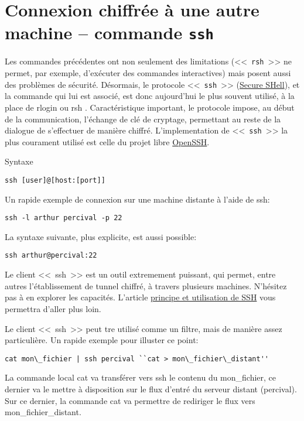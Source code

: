 \section{Connexion chiffr{\'e}e {\`a} une autre machine -- commande {\tt ssh}}
Les commandes pr{\'e}c{\'e}dentes ont non seulement des limitations (<<~{\tt rsh}~>> ne permet, par exemple, d'ex{\'e}cuter des commandes interactives) mais posent aussi des probl{\`e}mes de s{\'e}curit{\'e}. D{\'e}sormais, le protocole <<~\texttt{ssh}~>> (\href{http://fr.wikipedia.org/wiki/Secure_shell/}{Secure SHell}), et la commande qui lui est associ{\'e}, est donc aujourd'hui le plus souvent utilis{\'e}, {\`a} la place de rlogin ou rsh .
Caract{\'e}ristique important, le protocole impose, au d{\'e}but de la communication, l'{\'e}change de cl{\'e} de cryptage, permettant au reste de la dialogue de s'effectuer de mani{\`e}re chiffr{\'e}.
L'implementation de <<~{\tt ssh}~>> la plus courament utilis{\'e} est celle du projet libre \href{http://www.openssh.org/fr/index.html}{OpenSSH}.
\begin{definition}{Syntaxe}
\begin{verbatim}
ssh [user]@[host:[port]]
\end{verbatim}
\end{definition}
Un rapide exemple de connexion sur une machine distante {\`a} l'aide de ssh:
\begin{verbatim}
ssh -l arthur percival -p 22
\end{verbatim}

La syntaxe suivante, plus explicite, est aussi possible:
\begin{verbatim}
ssh arthur@percival:22 
\end{verbatim}


\begin{remarque}
Le client <<~{ssh}~>> est un outil extremement puissant, qui permet, entre autres l'{\'e}tablissement de tunnel chiffr{\'e}, {\`a} travers plusieurs machines. N'h{\'e}sitez pas {\`a} en explorer les capacit{\'e}s. L'article \href{http://www.unixgarden.com/index.php/administration-systeme/principes-et-utilisation-de-ssh}{principe et utilisation de SSH} vous permettra d'aller plus loin.
\end{remarque}
% 
\begin{remarque}
Le client <<~{ssh}~>> peut tre utilis{\'e} comme un filtre, mais de mani{\`e}re assez particuli{\`e}re. Un rapide exemple pour illuster ce point:
\begin{verbatim}
cat mon\_fichier | ssh percival ``cat > mon\_fichier\_distant'' 
\end{verbatim}

La commande local cat va transf{\'e}rer vers ssh le contenu du mon\_fichier, ce dernier va le mettre {\`a} disposition sur le flux d'entr{\'e} du serveur distant (percival). Sur ce dernier, la commande cat va permettre de rediriger le flux vers mon\_fichier\_distant. 
\end{remarque}


